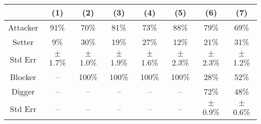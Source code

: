 \begin{tabular}{c|ccccccc}
    &  (1)&  (2)&  (3)&  (4)&  (5)&  (6)&  (7)\\
    \hline
    Attacker  &  91\%       &  70\%       &  81\%       &  73\%       &  88\%       &  79\%       &  69\%\\
    Setter    &  9\%        &  30\%       &  19\%       &  27\%       &  12\%       &  21\%       &  31\%\\
    Std Err   & $\pm$1.7\%  & $\pm$1.0\%  & $\pm$1.9\%  & $\pm$1.6\%  & $\pm$2.3\%  & $\pm$2.3\%  & $\pm$1.2\%\\
    \hline
    Blocker   & --          & 100\%       & 100\%       & 100\%       & 100\%       &  28\%       &  52\%\\
    Digger    & --          & --          & --          & --          & --          &  72\%       &  48\%\\
    Std Err   & --          & --          & --          & --          & --          & $\pm$0.9\%  & $\pm$0.6\%\\
\end{tabular}
